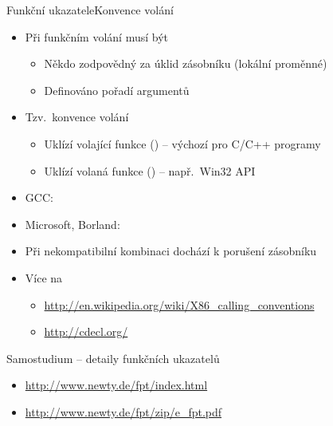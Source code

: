 \begin{frame}{Funkční ukazatele}{Konvence volání}

  \begin{itemize}
    \item Při funkčním volání musí být
    \begin{itemize}
      \item Někdo zodpovědný za úklid zásobníku (lokální proměnné)
      \item Definováno pořadí argumentů
    \end{itemize}

    \pause

    \item Tzv.\ konvence volání
    \begin{itemize}
      \item Uklízí volající funkce () -- výchozí pro C/C++ programy
      \item Uklízí volaná funkce () -- např.\ Win32 API
    \end{itemize}

    \pause

    \item GCC: 
    \item Microsoft, Borland: 

    \pause

    \item Při nekompatibilní kombinaci dochází k porušení zásobníku
    \item Více na
    \begin{itemize}
      \item \url{http://en.wikipedia.org/wiki/X86_calling_conventions}
      \item \url{http://cdecl.org/}
    \end{itemize}

  \end{itemize}

\end{frame}

\begin{frame}{Samostudium -- detaily funkčních ukazatelů}

  \begin{itemize}
    \item \url{http://www.newty.de/fpt/index.html}
    \item \url{http://www.newty.de/fpt/zip/e_fpt.pdf}
  \end{itemize}

\end{frame}


